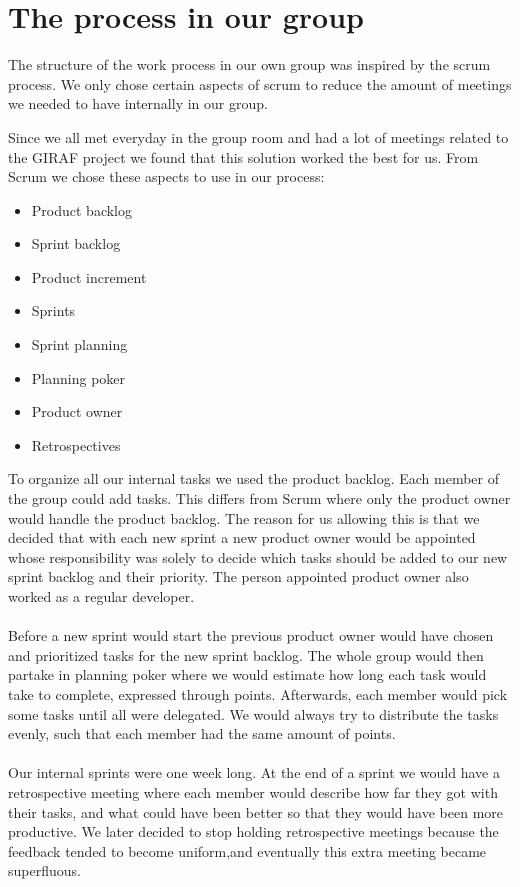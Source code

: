 \section{The process in our group} \label{intro:the-process-in-our-group}
The structure of the work process in our own group was inspired by the scrum process.
We only chose certain aspects of scrum to reduce the amount of meetings we needed to have internally in our group. 

Since we all met everyday in the group room and had a lot of meetings related to the GIRAF project we found that this solution worked the best for us.
From Scrum we chose these aspects to use in our process:

 \begin{itemize}
    \item Product backlog
    \item Sprint backlog
    \item Product increment
    \item Sprints
    \item Sprint planning
    \item Planning poker
    \item Product owner
    \item Retrospectives
 \end{itemize}
To organize all our internal tasks we used the product backlog.
Each member of the group could add tasks.
This differs from Scrum where only the product owner would handle the product backlog.
The reason for us allowing this is that we decided that with each new sprint a new product owner would be appointed whose responsibility was solely to decide which tasks should be added to our new sprint backlog and their priority.
The person appointed product owner also worked as a regular developer.
\\\\
Before a new sprint would start the previous product owner would have chosen and prioritized tasks for the new sprint backlog.
The whole group would then partake in planning poker where we would estimate how long each task would take to complete, expressed through points.
Afterwards, each member would pick some tasks until all were delegated.
We would always try to distribute the tasks evenly, such that each member had the same amount of points.
\\\\
Our internal sprints were one week long.
At the end of a sprint we would have a retrospective meeting where each member would describe how far they got with their tasks, and what could have been better so that they would have been more productive.
We later decided to stop holding retrospective meetings because the feedback tended to become uniform,and eventually this extra meeting became superfluous.


